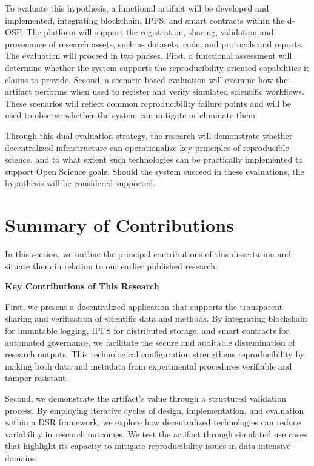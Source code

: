 \documentclass[final]{rc-book-2.14}
\begin{document}
To evaluate this hypothesis, a functional artifact will be developed and implemented, integrating blockchain, IPFS, and smart contracts within the d-OSP. The platform will support the registration, sharing, validation and provenance of research assets, such as datasets, code, and protocols and reports. The evaluation will proceed in two phases. First, a functional assessment will determine whether the system supports the reproducibility-oriented capabilities it claims to provide. Second, a scenario-based evaluation will examine how the artifact performs when used to register and verify simulated scientific workflows. These scenarios will reflect common reproducibility failure points and will be used to observe whether the system can mitigate or eliminate them.

Through this dual evaluation strategy, the research will demonstrate whether decentralized infrastructure can operationalize key principles of reproducible science, and to what extent such technologies can be practically implemented to support Open Science goals. Should the system succeed in these evaluations, the hypothesis will be considered supported.

\section{Summary of Contributions}
\label{chp:intro:sec:contributions}

In this section, we outline the principal contributions of this dissertation and situate them in relation to our earlier published research.

\textbf{Key Contributions of This Research}

First, we present a decentralized application that supports the transparent sharing and verification of scientific data and methods. By integrating blockchain for immutable logging, IPFS for distributed storage, and smart contracts for automated governance, we facilitate the secure and auditable dissemination of research outputs. This technological configuration strengthens reproducibility by making both data and metadata from experimental procedures verifiable and tamper-resistant.

Second, we demonstrate the artifact's value through a structured validation process. By employing iterative cycles of design, implementation, and evaluation within a DSR framework, we explore how decentralized technologies can reduce variability in research outcomes. We test the artifact through simulated use cases that highlight its capacity to mitigate reproducibility issues in data-intensive domains.
\end{document}
